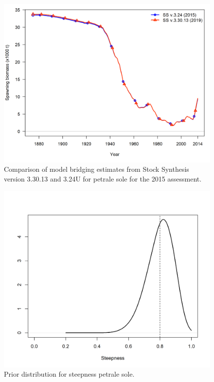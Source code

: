 \documentclass[12pt,]{article}
\begin{document}
\FloatBarrier

\begin{figure}
\centering
\includegraphics{Figures/compare1_spawnbio.png}
\caption{Comparison of model bridging estimates from Stock Synthesis
version 3.30.13 and 3.24U for petrale sole for the 2015 assessment.
\label{fig:bridge}}
\end{figure}

\FloatBarrier 

\begin{figure}
\centering
\includegraphics{Figures/h_prior.png}
\caption{Prior distribution for steepness petrale sole.
\label{fig:h_prior}}
\end{figure}
\end{document}
